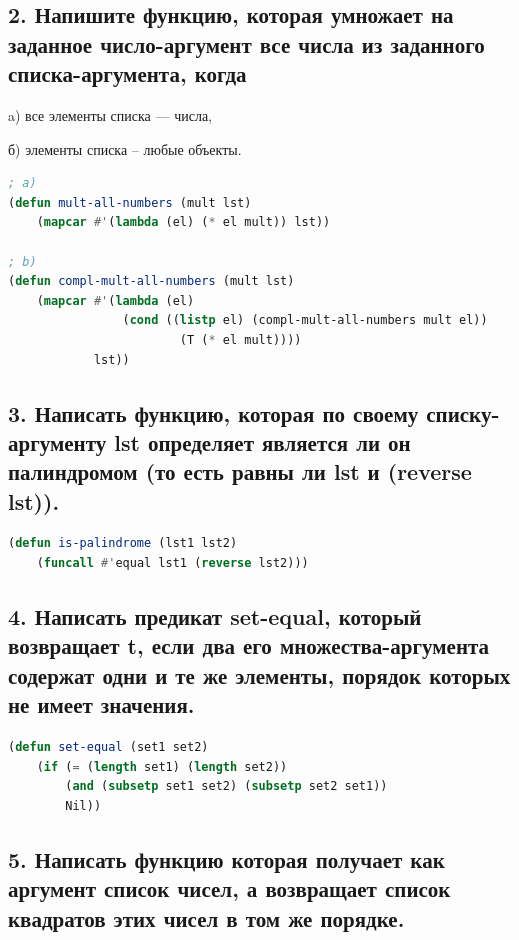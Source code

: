 \documentclass[12pt]{report}
\begin{document}
\subsection*{2. Напишите функцию, которая умножает на заданное число-аргумент все числа
	из заданного списка-аргумента, когда}

a) все элементы списка --- числа,

б) элементы списка -- любые объекты.

\begin{lstlisting}[label=6xd, caption=Решение задания №2, language=lisp]
; a)
(defun mult-all-numbers (mult lst)
	(mapcar #'(lambda (el) (* el mult)) lst))
	
; b)
(defun compl-mult-all-numbers (mult lst)
	(mapcar #'(lambda (el) 
				(cond ((listp el) (compl-mult-all-numbers mult el))
						(T (* el mult))))
			lst))

\end{lstlisting}

\subsection*{3. Написать функцию, которая по своему списку-аргументу lst определяет
	является ли он палиндромом (то есть равны ли lst и (reverse lst)).}

\begin{lstlisting}[label=6xd, caption=Решение задания №3, language=lisp]
(defun is-palindrome (lst1 lst2) 
	(funcall #'equal lst1 (reverse lst2)))

\end{lstlisting}

\subsection*{4. Написать предикат set-equal, который возвращает t, если два его множества-аргумента содержат одни и те же элементы, порядок которых не имеет значения.}

\begin{lstlisting}[label=6xd, caption=Решение задания №4, language=lisp]
(defun set-equal (set1 set2)
	(if (= (length set1) (length set2))
		(and (subsetp set1 set2) (subsetp set2 set1))
		Nil))

\end{lstlisting}

\subsection*{5. Написать функцию которая получает как аргумент список чисел, а возвращает список
	квадратов этих чисел в том же порядке.}
\end{document}
